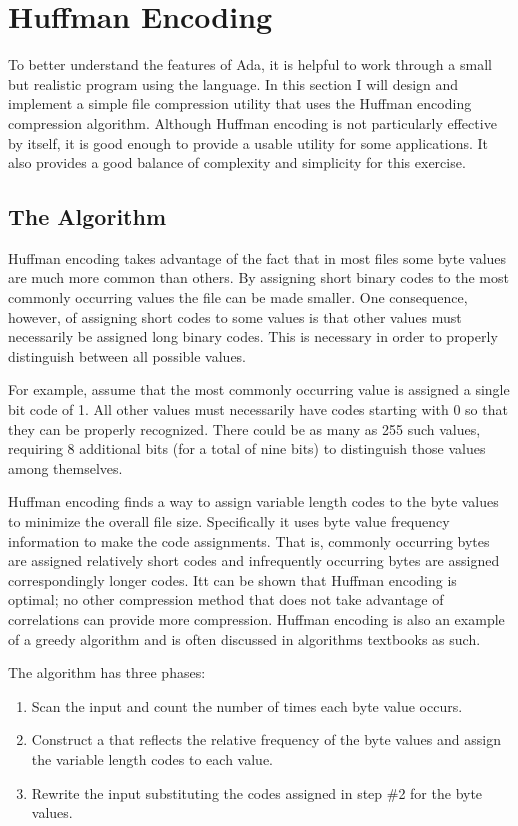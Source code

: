
\chapter{Huffman Encoding}
\label{chapt:huffman-encoding}

To better understand the features of Ada, it is helpful to work through a small but realistic
program using the language. In this section I will design and implement a simple file
compression utility that uses the Huffman encoding compression algorithm. Although Huffman
encoding is not particularly effective by itself, it is good enough to provide a usable utility
for some applications. It also provides a good balance of complexity and simplicity for this
exercise.

\section{The Algorithm}

Huffman encoding takes advantage of the fact that in most files some byte values are much more
common than others. By assigning short binary codes to the most commonly occurring values the
file can be made smaller. One consequence, however, of assigning short codes to some values is
that other values must necessarily be assigned long binary codes. This is necessary in order to
properly distinguish between all possible values.

For example, assume that the most commonly occurring value is assigned a single bit code of 1.
All other values must necessarily have codes starting with 0 so that they can be properly
recognized. There could be as many as 255 such values, requiring 8 additional bits (for a total
of nine bits) to distinguish those values among themselves.

Huffman encoding finds a way to assign variable length codes to the byte values to minimize the
overall file size. Specifically it uses byte value frequency information to make the code
assignments. That is, commonly occurring bytes are assigned relatively short codes and
infrequently occurring bytes are assigned correspondingly longer codes. Itt can be shown that
Huffman encoding is optimal; no other compression method that does not take advantage of
correlations can provide more compression. Huffman encoding is also an example of a greedy
algorithm and is often discussed in algorithms textbooks as such.

The algorithm has three phases:

\begin{enumerate}

\item Scan the input and count the number of times each byte value occurs.

\item Construct a  that reflects the relative frequency of the byte values
  and assign the variable length codes to each value.

\item Rewrite the input substituting the codes assigned in step \#2 for the byte values.

\end{enumerate}

